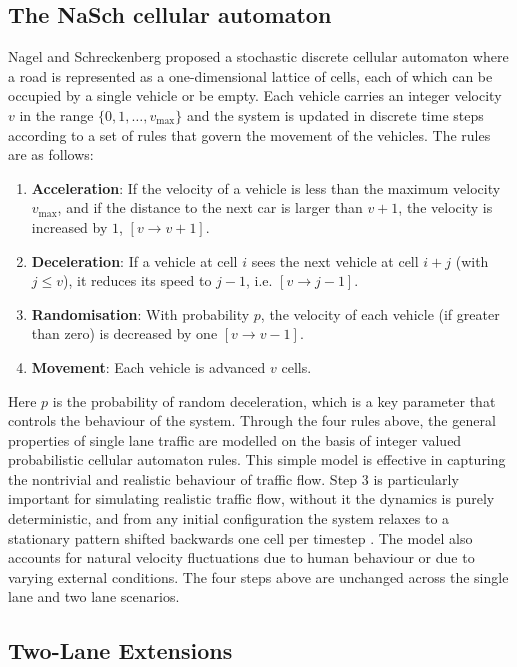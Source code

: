 \subsection{The NaSch cellular automaton} \label{sec: Nasch}
Nagel and Schreckenberg proposed a stochastic discrete cellular automaton where a road is represented as a one-dimensional lattice of cells, each of which can be occupied by a single vehicle or be empty.
 Each vehicle carries an integer velocity $v$ in the range $\{0, 1, \ldots, v_{\max}\}$ and the system is updated in discrete time steps according to a set of rules that govern the movement of the vehicles.
The rules are as follows:
\begin{enumerate} 
    \item \textbf{Acceleration}: If the velocity of a vehicle is less than the maximum velocity $v_{\max}$, and if the distance to the next car is larger than $v+1$, the velocity is increased by $1$, $\left[v \rightarrow v+1\right]$.
    \item \textbf{Deceleration}: If a vehicle at cell $i$ sees the next vehicle at cell $i+j$ (with $j \leq v$), it reduces its speed to $j-1$, i.e. $\left[v \rightarrow j-1 \right]$.
    \item \textbf{Randomisation}: With probability $p$, the velocity of each vehicle (if greater than zero) is decreased by one $\left[v \rightarrow v - 1\right]$.
    \item \textbf{Movement}: Each vehicle is advanced $v$ cells.
\end{enumerate}
Here $p$ is the probability of random deceleration, which is a key parameter that controls the behaviour of the system.
Through the four rules above, the general properties of single lane traffic are modelled on the basis of integer valued probabilistic cellular automaton rules.
This simple model is effective in capturing the nontrivial and realistic behaviour of traffic flow. 
Step $3$ is particularly important for simulating realistic traffic flow, without it the dynamics is purely deterministic, and from any initial configuration the system relaxes to a stationary pattern shifted backwards one cell per timestep \cite{nagelCellularAutomatonModel1992,schreckenbergDiscreteStochasticModels1995}.
The model also accounts for natural velocity fluctuations due to human behaviour or due to varying external conditions.
The four steps above are unchanged across the single lane and two lane scenarios.


\subsection{Two-Lane Extensions}

